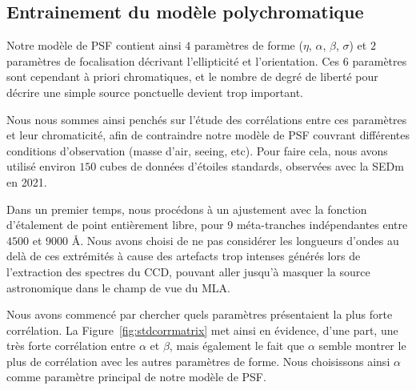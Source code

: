 \documentclass[../main/main.tex]{subfiles}
\begin{document}
\subsection{Entrainement du modèle polychromatique}\label{ssec:psftraining}

Notre modèle de PSF contient ainsi $4$ paramètres de forme ($\eta$,
$\alpha$, $\beta$, $\sigma$) et $2$ paramètres de focalisation décrivant
l'ellipticité et l'orientation. Ces $6$ paramètres sont cependant à
priori chromatiques, et le nombre de degré de liberté pour décrire une
simple source ponctuelle devient trop important.

Nous nous sommes ainsi penchés sur l'étude des corrélations entre ces
paramètres et leur chromaticité, afin de contraindre notre modèle de
PSF couvrant différentes conditions d'observation (masse d'air, seeing, etc). Pour faire cela, nous avons utilisé environ $150$ cubes de
données d'étoiles standards, observées avec la SEDm en 2021.

Dans un premier temps, nous procédons à un ajustement avec la fonction
d'étalement de point entièrement libre, pour 9 méta-tranches indépendantes
entre $4500$ et $9000$ \AA. Nous avons choisi de ne pas considérer les
longueurs d'ondes au delà de ces extrémités à cause des artefacts trop intenses
générés lors de l'extraction des spectres du CCD, pouvant aller jusqu'à
masquer la source astronomique dans le champ de vue du MLA.

Nous avons  commencé par chercher quels paramètres présentaient la
plus forte corrélation. La
Figure~\ref{fig:stdcorrmatrix} met ainsi en évidence, d'une part, une très forte
corrélation entre $\alpha$ et $\beta$, mais également le fait que
$\alpha$ semble montrer le plus de corrélation avec les autres
paramètres de forme. Nous choisissons ainsi $\alpha$ comme paramètre
principal de notre modèle de PSF.
\end{document}
